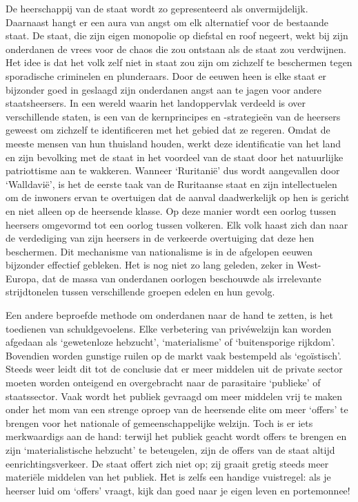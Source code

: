 \documentclass[
  a5paper,
  smalldemyvopaper,10pt,twoside,onecolumn,openright,extrafontsizes,hidelinks]{memoir}
\begin{document}
De heerschappij van de staat wordt zo gepresenteerd als onvermijdelijk.
Daarnaast hangt er een aura van angst om elk alternatief voor de
bestaande staat. De staat, die zijn eigen monopolie op diefstal en roof
negeert, wekt bij zijn onderdanen de vrees voor de chaos die zou
ontstaan als de staat zou verdwijnen. Het idee is dat het volk zelf niet
in staat zou zijn om zichzelf te beschermen tegen sporadische criminelen
en plunderaars. Door de eeuwen heen is elke staat er bijzonder goed in
geslaagd zijn onderdanen angst aan te jagen voor andere staatsheersers.
In een wereld waarin het landoppervlak verdeeld is over verschillende
staten, is een van de kernprincipes en -strategieën van de heersers
geweest om zichzelf te identificeren met het gebied dat ze regeren.
Omdat de meeste mensen van hun thuisland houden, werkt deze
identificatie van het land en zijn bevolking met de staat in het
voordeel van de staat door het natuurlijke patriottisme aan te wakkeren.
Wanneer `Ruritanië' dus wordt aangevallen door `Walldavië', is het de
eerste taak van de Ruritaanse staat en zijn intellectuelen om de
inwoners ervan te overtuigen dat de aanval daadwerkelijk op hen is
gericht en niet alleen op de heersende klasse. Op deze manier wordt een
oorlog tussen heersers omgevormd tot een oorlog tussen volkeren. Elk
volk haast zich dan naar de verdediging van zijn heersers in de
verkeerde overtuiging dat deze hen beschermen. Dit mechanisme van
nationalisme is in de afgelopen eeuwen bijzonder effectief gebleken. Het
is nog niet zo lang geleden, zeker in West-Europa, dat de massa van
onderdanen oorlogen beschouwde als irrelevante strijdtonelen tussen
verschillende groepen edelen en hun gevolg.

Een andere beproefde methode om onderdanen naar de hand te zetten, is
het toedienen van schuldgevoelens. Elke verbetering van privéwelzijn kan
worden afgedaan als `gewetenloze hebzucht', `materialisme' of
`buitensporige rijkdom'. Bovendien worden gunstige ruilen op de markt
vaak bestempeld als `egoïstisch'. Steeds weer leidt dit tot de conclusie
dat er meer middelen uit de private sector moeten worden onteigend en
overgebracht naar de parasitaire `publieke' of staatssector. Vaak wordt
het publiek gevraagd om meer middelen vrij te maken onder het mom van
een strenge oproep van de heersende elite om meer `offers' te brengen
voor het nationale of gemeenschappelijke welzijn. Toch is er iets
merkwaardigs aan de hand: terwijl het publiek geacht wordt offers te
brengen en zijn `materialistische hebzucht' te beteugelen, zijn de
offers van de staat altijd eenrichtingsverkeer. De staat offert zich
niet op; zij graait gretig steeds meer materiële middelen van het
publiek. Het is zelfs een handige vuistregel: als je heerser luid om
`offers' vraagt, kijk dan goed naar je eigen leven en portemonnee!
\end{document}
